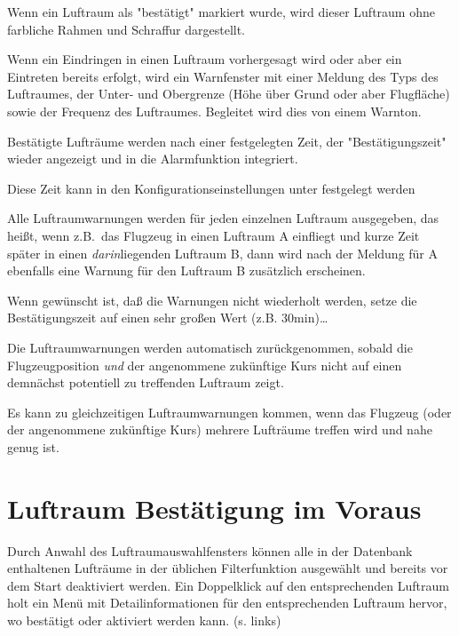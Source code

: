 Wenn ein Luftraum als "bestätigt" markiert wurde, wird dieser Luftraum
ohne farbliche Rahmen und Schraffur dargestellt.

Wenn ein Eindringen in einen Luftraum vorhergesagt wird oder aber ein
Eintreten bereits erfolgt, wird ein Warnfenster mit einer Meldung des Typs
des Luftraumes, der Unter- und Obergrenze (Höhe über Grund oder aber
Flugfläche) sowie der Frequenz des Luftraumes.
Begleitet wird dies von einem Warnton.



Bestätigte Lufträume werden nach einer festgelegten Zeit, der "Bestätigungszeit"
wieder angezeigt und in die Alarmfunktion integriert. 

Diese Zeit kann in den Konfigurationseinstellungen unter  festgelegt werden

Alle Luftraumwarnungen werden für jeden einzelnen Luftraum ausgegeben, das heißt,
 wenn z.B.\ das Flugzeug in einen Luftraum \textsf{A} einfliegt und kurze
Zeit später in einen \textsl{darin}liegenden Luftraum \textsf{B}, dann wird
nach der Meldung für \textsf{A} ebenfalls eine Warnung für den Luftraum
\textsf{B} zusätzlich erscheinen.

\tip Wenn gewünscht ist, daß die Warnungen nicht wiederholt werden, setze die
 Bestätigungszeit auf einen sehr großen Wert (z.B. 30min)\dots

Die Luftraumwarnungen werden automatisch zurückgenommen, sobald die
Flugzeugposition \emph{und}  der angenommene zukünftige Kurs nicht auf einen
demnächst potentiell zu treffenden Luftraum zeigt.

Es kann zu gleichzeitigen  Luftraumwarnungen kommen, wenn  das Flugzeug
(oder der angenommene zukünftige Kurs) mehrere Lufträume treffen wird und nahe
genug ist.

\section{Luftraum Bestätigung im Voraus}\label{sec:air-ack}

Durch Anwahl des Luftraumauswahlfensters können alle in der Datenbank enthaltenen Lufträume in der üblichen  Filterfunktion  ausgewählt und bereits vor dem Start deaktiviert  werden.  Ein Doppelklick auf den entsprechenden Luftraum holt ein Menü mit Detailinformationen für den entsprechenden Luftraum hervor, wo bestätigt oder aktiviert werden kann.  (s. links) 

